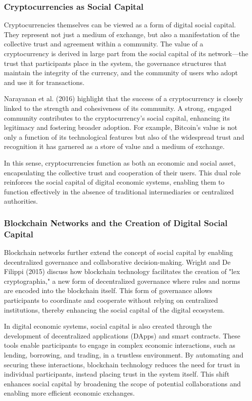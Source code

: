 \documentclass[12pt,twoside]{article}
\begin{document}
\subsubsection{Cryptocurrencies as Social Capital}

Cryptocurrencies themselves can be viewed as a form of digital social capital. They represent not just a medium of exchange, but also a manifestation of the collective trust and agreement within a community. The value of a cryptocurrency is derived in large part from the social capital of its network—the trust that participants place in the system, the governance structures that maintain the integrity of the currency, and the community of users who adopt and use it for transactions.

Narayanan et al. (2016) highlight that the success of a cryptocurrency is closely linked to the strength and cohesiveness of its community. A strong, engaged community contributes to the cryptocurrency's social capital, enhancing its legitimacy and fostering broader adoption. For example, Bitcoin’s value is not only a function of its technological features but also of the widespread trust and recognition it has garnered as a store of value and a medium of exchange.

In this sense, cryptocurrencies function as both an economic and social asset, encapsulating the collective trust and cooperation of their users. This dual role reinforces the social capital of digital economic systems, enabling them to function effectively in the absence of traditional intermediaries or centralized authorities.

\subsubsection{Blockchain Networks and the Creation of Digital Social Capital}

Blockchain networks further extend the concept of social capital by enabling decentralized governance and collaborative decision-making. Wright and De Filippi (2015) discuss how blockchain technology facilitates the creation of "lex cryptographia," a new form of decentralized governance where rules and norms are encoded into the blockchain itself. This form of governance allows participants to coordinate and cooperate without relying on centralized institutions, thereby enhancing the social capital of the digital ecosystem.

In digital economic systems, social capital is also created through the development of decentralized applications (DApps) and smart contracts. These tools enable participants to engage in complex economic interactions, such as lending, borrowing, and trading, in a trustless environment. By automating and securing these interactions, blockchain technology reduces the need for trust in individual participants, instead placing trust in the system itself. This shift enhances social capital by broadening the scope of potential collaborations and enabling more efficient economic exchanges.
\end{document}
